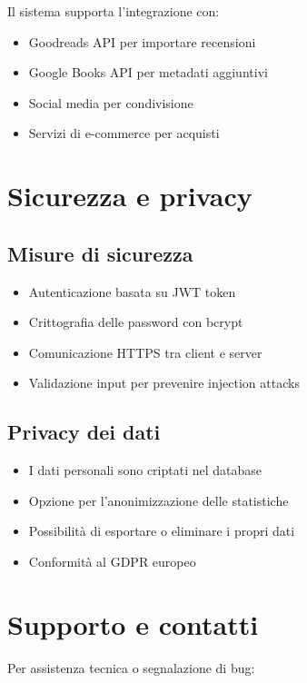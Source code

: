 \documentclass[12pt,a4paper]{article}
\begin{document}
Il sistema supporta l'integrazione con:

\begin{itemize}
    \item Goodreads API per importare recensioni
    \item Google Books API per metadati aggiuntivi
    \item Social media per condivisione
    \item Servizi di e-commerce per acquisti
\end{itemize}

\section{Sicurezza e privacy}

\subsection{Misure di sicurezza}

\begin{itemize}
    \item Autenticazione basata su JWT token
    \item Crittografia delle password con bcrypt
    \item Comunicazione HTTPS tra client e server
    \item Validazione input per prevenire injection attacks
\end{itemize}

\subsection{Privacy dei dati}

\begin{itemize}
    \item I dati personali sono criptati nel database
    \item Opzione per l'anonimizzazione delle statistiche
    \item Possibilità di esportare o eliminare i propri dati
    \item Conformità al GDPR europeo
\end{itemize}

\section{Supporto e contatti}

Per assistenza tecnica o segnalazione di bug:
\end{document}

